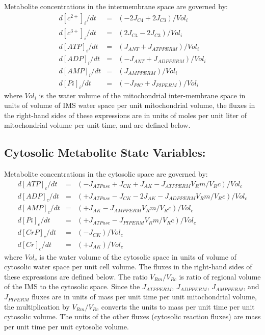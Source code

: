 \documentclass[fleqn,10pt]{physiome}
\begin{document}
Metabolite concentrations in the intermembrane space are governed by:
\begin{eqnarray}\label{eq:3}
  d[c^{2+} ]_i/dt &=& \left(-2J_{C4} + 2J_{C3} \right) / Vol_i \nonumber\\	
  d[c^{3+} ]_i/dt &=& \left(2J_{C4} - 2J_{C3} \right) / Vol_i \nonumber\\	
  d[ATP]_i/dt     &=& \left(J_{ANT} + J_{ATPPERM} \right) / Vol_i \nonumber\\	
  d[ADP]_i/dt     &=& \left(-J_{ANT} + J_{ADPPERM} \right) / Vol_i \nonumber\\	
  d[AMP]_i/dt     &=& \left(J_{AMPPERM} \right) / Vol_i \nonumber\\	
  d[Pi]_i/dt      &=& \left(-J_{PIC} + J_{PIPERM} \right) / Vol_i 
\end{eqnarray}
where $Vol_i$ is the water volume of the mitochondrial inter-membrane space in units of volume of IMS water space per unit mitochondrial volume, the fluxes in the right-hand sides of these expressions are in units of moles per unit liter of mitochondrial volume per unit time, and are defined below.

\subsection{Cytosolic Metabolite State Variables:}

Metabolite concentrations in the cytosolic space are governed by:
\begin{eqnarray}\label{eq:4}
  d[ATP]_c/dt &=& \left(-J_{ATPase} + J_{CK} + J_{AK} - J_{ATPPERM}  V_Rm/V_Rc  \right) / Vol_c \nonumber\\	
  d[ADP]_c/dt &=& \left(+J_{ATPase} - J_{CK} - 2J_{AK} - J_{ADPPERM}  V_Rm/V_Rc  \right) / Vol_c \nonumber\\
  d[AMP]_c/dt &=& \left(+J_{AK} - J_{AMPPERM}  V_Rm/V_Rc  \right) / Vol_c \nonumber\\
  d[Pi]_c/dt  &=& \left(+J_{ATPase} - J_{PIPERM}  V_Rm/V_Rc  \right) / Vol_c \nonumber\\
  d[CrP]_c/dt &=& \left(-J_{CK}  \right) / Vol_c \nonumber\\
  d[Cr]_c/dt  &=& \left(+J_{AK}  \right) / Vol_c
\end{eqnarray}
where $Vol_c$ is the water volume of the cytosolic space in units of volume of cytosolic water space per unit cell volume. The fluxes in the right-hand sides of these expressions are defined below. The ratio $V_{Rm}/V_{Rc}$  is ratio of regional volume of the IMS to the cytosolic space. Since the $J_{ATPPERM}$, $J_{ADPPERM}$, $J_{AMPPERM}$, and $J_{PIPERM}$ fluxes are in units of mass per unit time per unit mitochondrial volume, the multiplication by $V_{Rm}/V_{Rc}$  converts the units to mass per unit time per unit cytosolic volume. The units of the other fluxes (cytosolic reaction fluxes) are mass per unit time per unit cytosolic volume. 
\end{document}
